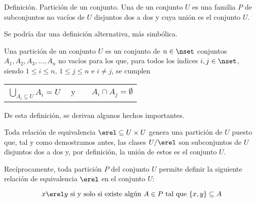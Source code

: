 Definición. Partición de un conjunto. Una  de un conjunto
$U$ es una familia $P$ de subconjuntos no vacíos de $U$ disjuntos dos a dos
y cuya unión es el conjunto $U$.

Se podría dar una definición alternativa, más simbólica.

Una partición de un conjunto $U$ es un conjunto de $n \in \nset$ conjuntos
$A_1, A_2, A_3, \ldots, A_n$ no vacíos para los que, para todos los índices
$i, j \in \nset$, siendo $1 \leq i \leq n$, $1 \leq j \leq n$ e $i \neq j$,
se cumplen

\begin{center}
  \begin{tabular}{lr}
    $\bigcup_{A_i \subseteq U} A_i = U \quad$ y
      & $\quad A_i \cap A_j = \emptyset$ \\
  \end{tabular}
\end{center}

De esta definición, se derivan algunos hechos importantes.

Toda relación de equivalencia $\erel \subseteq U \times U$ genera una
partición de $U$ puesto que, tal y como demostramos antes, las clases
$U/\erel$ son subconjuntos de $U$ disjuntos dos a dos y, por definición, la
unión de estos es el conjunto $U$.

Recíprocamente, toda partición $P$ del conjunto $U$ permite definir la
siguiente relación de equivalencia $\erel$ en el conjunto $U$:

$$ x \erel y \ \text{si y solo si existe algún} \ A \in P \ \text{tal que} \
\{x, y\} \subseteq A $$



